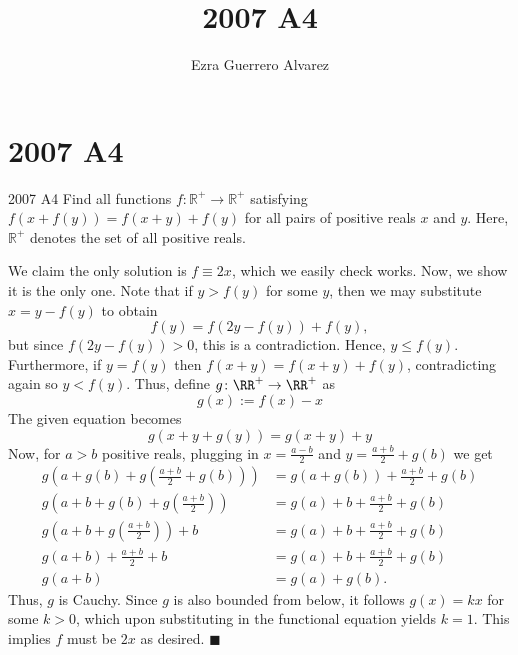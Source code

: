 \documentclass[14pt]{article}
\title{2007 A4}
\author{Ezra Guerrero Alvarez}
\begin{document}
\maketitle
	
\section*{2007 A4}

\begin{statement}{2007 A4}
	Find all functions $f: \mathbb{R}^{ + }\to\mathbb{R}^{ + }$ satisfying $f\left(x + f\left(y\right)\right) = f\left(x + y\right) + f\left(y\right)$ for all pairs of positive reals $x$ and $y$. Here, $\mathbb{R}^{ + }$ denotes the set of all positive reals.
\end{statement}
We claim the only solution is $f\equiv 2x$, which we easily check works. Now, we show it is the only one. Note that if $y>f(y)$ for some $y$, then we may substitute $x=y-f(y)$ to obtain
\[ f(y)=f(2y-f(y))+f(y), \]
but since $f(2y-f(y))>0$, this is a contradiction. Hence, $y\le f(y)$. Furthermore, if $y=f(y)$ then $f(x+y)=f(x+y)+f(y)$, contradicting again so $y<f(y)$. Thus, define $g\colon\RR^+\to\RR^+$ as
\[ g(x):=f(x)-x \]
The given equation becomes
\[ g(x+y+g(y))=g(x+y)+y \]
Now, for $a>b$ positive reals, plugging in $x=\frac{a-b}2$ and $y=\frac{a+b}2+g(b)$ we get
\begin{align*}
	g\left(a+g(b)+g\left(\frac{a+b}2+g(b)\right)\right)&=g(a+g(b))+\frac{a+b}2+g(b)\\
	g\left(a+b+g(b)+g\left(\frac{a+b}2\right)\right)&=g(a)+b+\frac{a+b}2+g(b)\\
	g\left(a+b+g\left(\frac{a+b}2\right)\right)+b&=g(a)+b+\frac{a+b}2+g(b)\\
	g(a+b)+\frac{a+b}2+b&=g(a)+b+\frac{a+b}2+g(b)\\
	g(a+b)&=g(a)+g(b).
\end{align*}
Thus, $g$ is Cauchy. Since $g$ is also bounded from below, it follows $g(x)=kx$ for some $k>0$, which upon substituting in the functional equation yields $k=1$. This implies $f$ must be $2x$ as desired. $\blacksquare$
	
\end{document}

